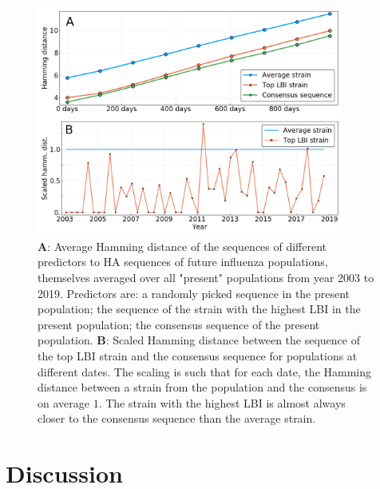 \documentclass{article}
\begin{document}
	\begin{figure}
		\centering
		\includegraphics[width=0.9\textwidth]{./Figures/Panel5.png}
		\caption{\textbf{A}: Average Hamming distance of the sequences of different predictors to HA sequences of future influenza populations, themselves averaged over all "present" populations from year 2003 to 2019. Predictors are: a randomly picked sequence in the present population; the sequence of the strain with the highest LBI in the present population; the consensus sequence of the present population. \textbf{B}: Scaled Hamming distance between the sequence of the top LBI strain and the consensus sequence for populations at different dates. The scaling is such that for each date, the Hamming distance between a strain from the population and the consensus is on average $1$. The strain with the highest LBI is almost always closer to the consensus sequence than the average strain.}
		\label{fig:panel5}
	\end{figure}


\section*{Discussion} %
\label{sec:discussion}
\end{document}
